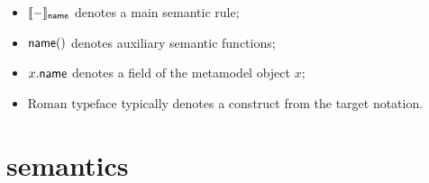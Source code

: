 \begin{itemize}
\item
	\(\llbracket - \rrbracket_{\mathsf{name}}\) denotes a main semantic rule;
\item
	\(\mathsf{name}()\) denotes auxiliary semantic functions;
\item
	\(x.\mathsf{name}\) denotes a field of the metamodel object \(x\);
\item
	\(\text{Roman typeface}\) typically denotes a construct from the target
	notation.
\end{itemize}

\section{\tockcsp{} semantics}\label{sec:semantics-tockcsp}

